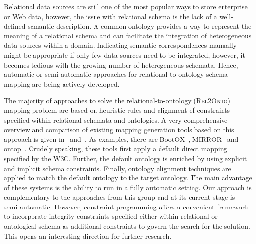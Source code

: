\documentclass[letterpaper]{article} %
\newcommand{\relonto}{\textsc{Rel2Onto}}
\begin{document}
Relational data sources are still one of the most popular ways to store enterprise or Web data, however, the issue with relational schema is the lack of a well-defined semantic description.
A common ontology provides a way to represent the meaning of a relational schema and can facilitate the integration of heterogeneous data sources within a domain.
Indicating semantic correspondences manually might be appropriate if only few data sources need to be integrated, however, it becomes tedious with the growing number of heterogeneous schemata.
Hence, automatic or semi-automatic approaches for relational-to-ontology schema mapping are being actively developed.


The majority of approaches to solve the relational-to-ontology (\relonto{}) mapping problem are based on heuristic rules and alignment of constraints specified within relational schemata and ontologies.
A very comprehensive overview and comparison of existing mapping generation tools based on this approach is given in~\cite{Pinkel:rodi} and~\cite{Spanos:semweb}.
As examples, there are BootOX~\cite{Jimenez:Bootox}, MIRROR~\cite{Luciano:Mirror} and  ontop~\cite{Fagin:Clio}.
Crudely speaking, these tools first apply a default direct mapping specified by the W3C.
Further, the default ontology is enriched by using explicit and implicit schema constraints.
Finally, ontology alignment techniques are applied to match the default ontology to the target ontology.
The main advantage of these systems is the ability to run in a fully automatic setting.
Our approach is complementary to the approaches from this group and at its current stage is semi-automatic.
However, constraint programming offers a convenient framework to incorporate integrity constraints specified either within relational or ontological schema as additional constraints to govern the search for the solution.
This opens an interesting direction for further research.
\end{document}
